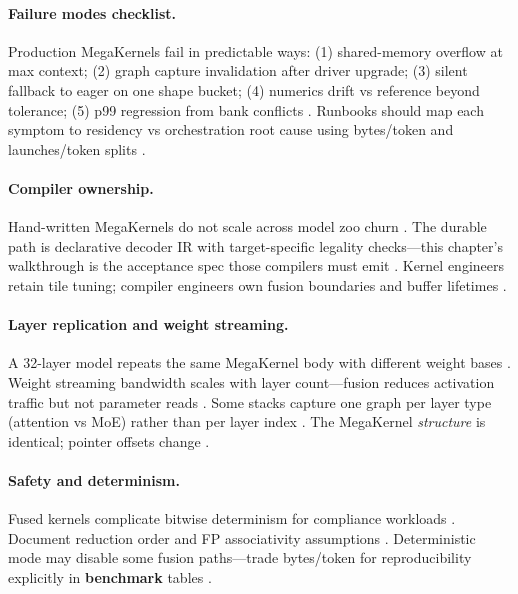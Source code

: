 \paragraph{Failure modes checklist.} Production MegaKernels fail in predictable ways: (1) shared-memory overflow at max context; (2) graph capture invalidation after driver upgrade; (3) silent fallback to eager on one shape bucket; (4) numerics drift vs reference beyond tolerance; (5) p99 regression from bank conflicts \citep{nvidia2024cudagraphs,memoryfloor2026,taxbreak2026}. Runbooks should map each symptom to residency vs orchestration root cause using bytes/token and launches/token splits \citep{patel2025llminference,yirage2026}.

\paragraph{Compiler ownership.} Hand-written MegaKernels do not scale across model zoo churn \citep{chen2020compilerbasedhardw,yirage2026}. The durable path is declarative decoder IR with target-specific legality checks---this chapter's walkthrough is the acceptance spec those compilers must emit \citep{liu2024deepseekv3,kwon2023vllm}. Kernel engineers retain tile tuning; compiler engineers own fusion boundaries and buffer lifetimes \citep{patel2025llminference,semianalysis2024tma}.

\paragraph{Layer replication and weight streaming.} A 32-layer model repeats the same MegaKernel body with different weight bases \citep{patel2025llminference,liu2024deepseekv3}. Weight streaming bandwidth scales with layer count---fusion reduces activation traffic but not parameter reads \citep{dlbook,memoryfloor2026}. Some stacks capture one graph per layer type (attention vs MoE) rather than per layer index \citep{taxbreak2026,nvidia2024cudagraphs}. The MegaKernel \emph{structure} is identical; pointer offsets change \citep{yirage2026,chen2020compilerbasedhardw}.

\paragraph{Safety and determinism.} Fused kernels complicate bitwise determinism for compliance workloads \citep{patel2025llminference,dlbook}. Document reduction order and FP associativity assumptions \citep{dao2022flashattention}. Deterministic mode may disable some fusion paths---trade bytes/token for reproducibility explicitly in \textbf{benchmark} tables \citep{memoryfloor2026,taxbreak2026}.

